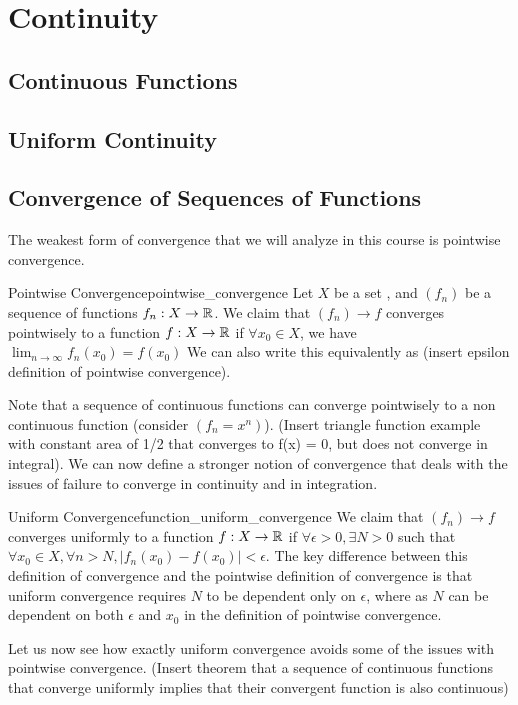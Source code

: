 \section{Continuity}
\subsection{Continuous Functions}
\subsection{Uniform Continuity}
\subsection{Convergence of Sequences of Functions}
The weakest form of convergence that we will analyze in this course is pointwise convergence.
\begin{defn}{Pointwise Convergence}{pointwise_convergence}
Let $X$ be a set , and $(f_n)$ be a sequence of functions $f_n: X \to {\mathbb R}$. We claim that $(f_n) \to f$ converges pointwisely to a function $f: X \to {\mathbb R}$ if $\forall x_0 \in X$, we have $\lim_{n \to \infty} f_n(x_0) = f(x_0)$ We can also write this equivalently as (insert epsilon definition of pointwise convergence).
\end{defn}
Note that a sequence of continuous functions can converge pointwisely to a non continuous function (consider $(f_n = x^n)$). (Insert triangle function example with constant area of 1/2 that converges to f(x) = 0, but does not converge in integral). We can now define a stronger notion of convergence that deals with the issues of failure to converge in continuity and in integration. 
\begin{defn}{Uniform Convergence}{function_uniform_convergence}
We claim that $(f_n) \to f$ converges uniformly to a function $f: X \to {\mathbb R}$ if $\forall \epsilon > 0,\exists N > 0$ such that $\forall x_0 \in X,\forall n > N, |f_n(x_0) - f(x_0)| < \epsilon$. The key difference between this definition of convergence and the pointwise definition of convergence is that uniform convergence requires $N$ to be dependent only on $\epsilon$, where as $N$ can be dependent on both $\epsilon$ and $x_0$ in the definition of pointwise convergence.
\end{defn}
Let us now see how exactly uniform convergence avoids some of the issues with pointwise convergence.
(Insert theorem that a sequence of continuous functions that converge uniformly implies that their convergent function is also continuous)
